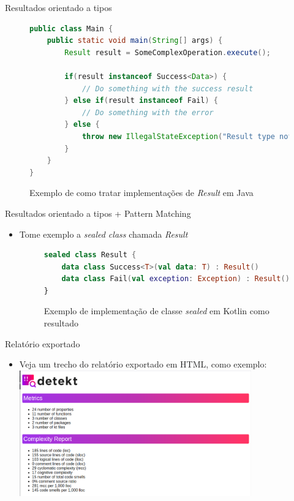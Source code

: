 \documentclass[brazilian]{beamer}
\begin{document}
\begin{frame}[fragile]{Resultados orientado a tipos}
    \begin{figure}[H]
        \centering
        \begin{lstlisting}[language=Java]
public class Main {
    public static void main(String[] args) {
        Result result = SomeComplexOperation.execute();
        
        if(result instanceof Success<Data>) {
            // Do something with the success result
        } else if(result instanceof Fail) {
            // Do something with the error
        } else {
            throw new IllegalStateException("Result type not implemented")
        }
    }
}
        \end{lstlisting}
        \caption{Exemplo de como tratar implementações de \emph{Result} em Java}
        \label{fig:java_if_else_statements}
    \end{figure}
\end{frame}

\begin{frame}[fragile]{Resultados orientado a tipos + Pattern Matching}
    \begin{itemize}
        \item Tome exemplo a \emph{sealed class} chamada \textit{Result}
        \begin{figure}[H]
            \centering
            \begin{lstlisting}[language=Kotlin]
sealed class Result {
    data class Success<T>(val data: T) : Result()
    data class Fail(val exception: Exception) : Result()
}
            \end{lstlisting}
            \caption{Exemplo de implementação de classe \textit{sealed} em Kotlin como resultado}
            \label{fig:kotlin_result_sealed_type}
        \end{figure}
    \end{itemize}
\end{frame}

\begin{frame}{Relatório exportado}
    \begin{itemize}
        \item Veja um trecho do relatório exportado em HTML, como exemplo:
        \centering
        \includegraphics[width=10cm]{report_overview}
    \end{itemize}
\end{frame}
\end{document}
